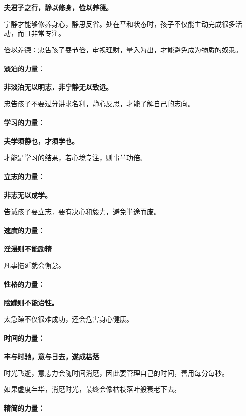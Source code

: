 \documentclass[UTF8,a4paper,8pt]{ctexart}
\begin{document}
 \textbf{夫君子之行，静以修身，俭以养德。}
 
 宁静才能够修养身心，静思反省。处在平和状态时，孩子不仅能主动完成很多活动，而且非常专注。
 
 俭以养德：忠告孩子要节俭，审视理财，量入为出，才能避免成为物质的奴隶。
 \paragraph{淡泊的力量：}
 
 \textbf{非淡泊无以明志，非宁静无以致远。}
 
 忠告孩子不要过分讲求名利，静心反思，才能了解自己的志向。	
 \paragraph{学习的力量：}
 
 \textbf{夫学须静也，才须学也。}
 
 才能是学习的结果，若心境专注，则事半功倍。
 \paragraph{立志的力量：}
 
 \textbf{非志无以成学。}
 
 告诫孩子要立志，要有决心和毅力，避免半途而废。
 \paragraph{速度的力量：}
 
 \textbf{淫漫则不能励精}
 
 凡事拖延就会懈怠。
 
 \paragraph{性格的力量：}
 
 \textbf{险躁则不能治性。}
 
 太急躁不仅很难成功，还会危害身心健康。
 
 \paragraph{时间的力量：}
 
 \textbf{丰与时驰，意与日去，遂成枯落}
 
 时光飞逝，意志力会随时间消磨，因此要管理自己的时间，善用每分每秒。
 
 如果虚度年华，消磨时光，最终会像枯枝落叶般衰老下去。
 \paragraph{精简的力量：}
 
\end{document}
